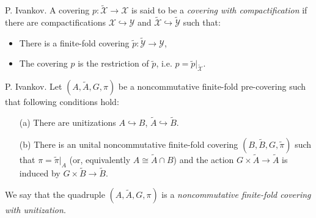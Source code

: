 \documentclass{beamer}
\theoremstyle{plain}
\newcommand{\hookto}{\hookrightarrow}        %
\begin{document}
\begin{frame}


\begin{definition}\label{top_cov_comp_defn}
	\alert{P. Ivankov}. 	A   covering $p: \widetilde{   \mathcal X } \to \mathcal X$ is said to be a \textit{ covering with compactification} if there are compactifications ${   \mathcal X } \hookto {   \mathcal Y }$ and $\widetilde{   \mathcal X } \hookto \widetilde{   \mathcal Y }$ such that:
	\begin{itemize}
		\item There is a finite-fold  covering $\widetilde{p}:\widetilde{   \mathcal Y }\to {   \mathcal Y }$,
		\item The covering $p$ is the restriction of $\widetilde{p}$, i.e. $p = \widetilde{p}|_{\widetilde{   \mathcal X }}$.
	\end{itemize}
\end{definition}
\begin{definition}\label{fin_comp_defn}\alert{P. Ivankov}.
	Let $\left(A, \widetilde{A}, G, \pi \right)$ be a noncommutative finite-fold  pre-covering such  that following conditions hold:
	\begin{enumerate}
		\item[(a)] 
		There are unitizations $A \hookto B$, $\widetilde{A} \hookto \widetilde{B}$.
		\item[(b)] There is an %
		unital  noncommutative finite-fold covering	$\left(B ,\widetilde{B}, G, \widetilde{\pi} \right)$ such that $\pi = \widetilde{\pi}|_A$ (or, equivalently $A \cong \widetilde{A}\cap B$) and the action $G \times\widetilde{A} \to \widetilde{A}$ is induced by $G \times\widetilde{B} \to \widetilde{B}$.
	\end{enumerate}
	We say that the  quadruple $\left(A, \widetilde{A}, G, \pi \right)$ is a
	\textit{noncommutative finite-fold covering with unitization}. 
\end{definition}

\end{frame}
\end{document}
